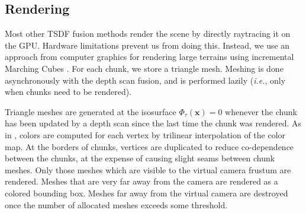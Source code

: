 \documentclass[conference]{IEEEtran}
\newcommand{\ie}{\textit{i.e.}\xspace}
\newcommand{\TSDF}{TSDF\xspace}
\begin{document}
\subsection{Rendering}
\label{section:render}
Most other \TSDF fusion methods \cite{Newcombe, NiessnerHashing} render the
scene by directly raytracing it on the GPU. Hardware limitations prevent us from doing
this. Instead, we use an approach from computer graphics for rendering large
terrains \cite{GPUGEMS3} using incremental Marching Cubes \cite{Lorensen1987}.
For each chunk, we store a triangle mesh. Meshing is done asynchronously with
the depth scan fusion, and is performed lazily (\ie, only when chunks need to
be rendered).

Triangle meshes are generated at the isosurface
$\Phi_{\tau}(\mathbf{x}) = 0$ whenever the chunk has been updated by a depth
scan since the last time the chunk was rendered. As in \cite{Bylow2013,
Whelan2013},  colors are computed for each vertex by trilinear interpolation of
the color map. At the borders of chunks, vertices are duplicated to reduce
co-dependence between the chunks, at the expense of causing slight seams
between chunk meshes. Only those meshes which are visible to the virtual camera
frustum are rendered. Meshes that are very far away from the camera are
rendered as a colored bounding box. Meshes far away from the virtual camera are
destroyed once the number of allocated meshes exceeds some threshold.
\end{document}
